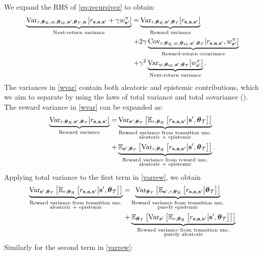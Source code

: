 \documentclass{article}
\begin{document}
We expand the RHS of \cref{eq:recursivez} to obtain:
\begin{align}
\underbrace{\Var_{r, \thetamcr, w, \thetamcw, \ns, \thetamct, \ac} \sqb{\rsanb + \gamma \wnb}}_{\text{Next-return variance}} = &\underbrace{\Var_{r, \thetamcr, \ns, \thetamct}[\rsanb] }_{\text{Reward variance}}  \label{wvar} \\
+ &2\gamma \underbrace{\Cov_{r, \thetamcr, w, \thetamcw, \ns, \thetamct}[\rsanb, \wnb]}_{\text{Reward-return covariance}} \nonumber \\
+& \gamma^2 \underbrace{\Var_{w, \thetamcw, \ns, \thetamct}[\wnb]}_{\text{Next-return variance}}. \nonumber
\end{align}
The variances in \cref{wvar} contain both aleatoric and epistemic contributions, which we aim to separate by using the laws of total variance and total covariance (\cite{weiss}). The reward variance in \cref{wvar} can be expanded as:
\begin{align} \label{varrew}
\underbrace{\Var_{r, \thetamcr, \ns, \thetamct}[\rsanb]}_{\text{Reward variance}} = &\underbrace{\Var_{\ns, \thetamct}\sqb{ \E_{r, \thetamcr} \sqb{\rsanb \big| \ns, \thetamct}}}_{\substack{\text{Reward variance from transition unc.} \\ \text{aleatoric + epistemic}}}  \\ 
+ &\underbrace{\E_{\ns, \thetamct}\sqb{ \Var_{r, \thetamcr} \sqb{\rsanb \big| \ns, \thetamct}}}_{\substack{\text{Reward variance from reward unc.} \\ \text{aleatoric + epistemic}}}.\nonumber
\end{align}
Applying total variance to the first term in \cref{varrew}, we obtain
\begin{align} 
\underbrace{\Var_{\ns, \thetamct}\sqb{ \E_{r, \thetamcr} \sqb{\rsanb \big| \ns, \thetamct}}}_{\substack{\text{Reward variance from transition unc.} \\ \text{aleatoric + epistemic}}} =& \underbrace{\Var_{\thetamct} \sqb{ \E_{\ns, r, \thetamcr} \sqb{\rsanb \big| \thetamct}}}_{\substack{\text{Reward variance from transition unc.} \\ \text{purely epistemic}}} \\
+& \underbrace{\E_{\thetamct}\sqb{ \Var_{\ns} \sqb{ \E_{r, \thetamcr} \sqb{\rsanb \big| \ns, \thetamct}}}}_{\substack{\text{Reward variance from transition unc.} \\ \text{purely aleatoric}}}\nonumber
\end{align}
Similarly for the second term in \cref{varrew}:
\end{document}
